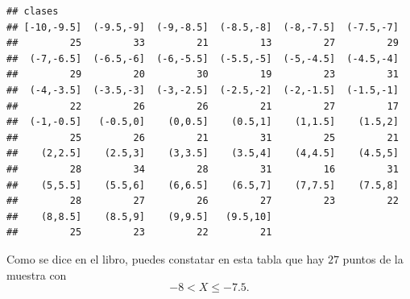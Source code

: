 \documentclass[10pt,a4paper]{article}
\begin{document}
\begin{enumerate}
\begin{knitrout}
\begin{kframe}
\begin{alltt}
\end{alltt}
\begin{verbatim}
## clases
## [-10,-9.5]  (-9.5,-9]  (-9,-8.5]  (-8.5,-8]  (-8,-7.5]  (-7.5,-7] 
##         25         33         21         13         27         29 
##  (-7,-6.5]  (-6.5,-6]  (-6,-5.5]  (-5.5,-5]  (-5,-4.5]  (-4.5,-4] 
##         29         20         30         19         23         31 
##  (-4,-3.5]  (-3.5,-3]  (-3,-2.5]  (-2.5,-2]  (-2,-1.5]  (-1.5,-1] 
##         22         26         26         21         27         17 
##  (-1,-0.5]   (-0.5,0]    (0,0.5]    (0.5,1]    (1,1.5]    (1.5,2] 
##         25         26         21         31         25         21 
##    (2,2.5]    (2.5,3]    (3,3.5]    (3.5,4]    (4,4.5]    (4.5,5] 
##         28         34         28         31         16         31 
##    (5,5.5]    (5.5,6]    (6,6.5]    (6.5,7]    (7,7.5]    (7.5,8] 
##         28         27         26         27         23         22 
##    (8,8.5]    (8.5,9]    (9,9.5]   (9.5,10] 
##         25         23         22         21
\end{verbatim}
\end{kframe}
\end{knitrout}
Como se dice en el libro, puedes constatar en esta tabla que hay $27$ puntos de la muestra con
\[-8<X\leq -7.5.\]


\end{enumerate}
\end{document}
